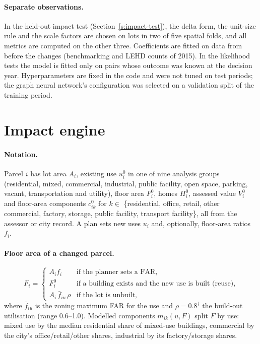 \documentclass[10pt]{article}
\begin{document}
\paragraph{Separate observations.} In the held-out impact test (Section~\ref{s:impact-test}), the delta form, the
unit-size rule and the scale factors are chosen on lots in two of five spatial folds, and all metrics are computed on
the other three. Coefficients are fitted on data from before the changes (benchmarking and LEHD counts of 2015). In
the likelihood tests the model is fitted only on pairs whose outcome was known at the decision year. Hyperparameters
are fixed in the code and were not tuned on test periods; the graph neural network's configuration was selected on a
validation split of the training period.

\section{Impact engine}\label{s:engine}

\paragraph{Notation.} Parcel $i$ has lot area $A_i$, existing use $u^0_i$ in one of nine analysis groups (residential,
mixed, commercial, industrial, public facility, open space, parking, vacant, transportation and utility), floor area
$F^0_i$, homes $H^0_i$, assessed value $V^0_i$ and floor-area components $c^0_{ik}$ for $k \in$ \{residential, office,
retail, other commercial, factory, storage, public facility, transport facility\}, all from the assessor or city record.
A plan sets new uses $u_i$ and, optionally, floor-area ratios $f_i$.

\paragraph{Floor area of a changed parcel.}
\begin{equation}
F_i = \begin{cases} A_i f_i & \text{if the planner sets a FAR,}\\
F^0_i & \text{if a building exists and the new use is built (reuse),}\\
A_i\,\bar f_{iu}\,\rho & \text{if the lot is unbuilt,} \end{cases}
\end{equation}
where $\bar f_{iu}$ is the zoning maximum FAR for the use and $\rho = 0.8^\dagger$ the build-out utilisation (range
0.6--1.0). Modelled components $m_{ik}(u, F)$ split $F$ by use: mixed use by the median residential
share of mixed-use buildings, commercial by the city's office/retail/other shares, industrial by its factory/storage
shares.
\end{document}
